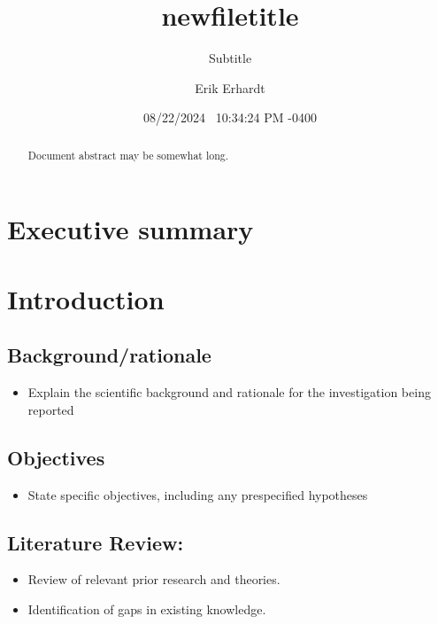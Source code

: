\documentclass[
  letterpaper,
  DIV=11,
  numbers=noendperiod,
  oneside,
  11pt]{scrartcl}
\title{newfiletitle}
\subtitle{Subtitle}
\author{Erik Erhardt}
\date{08/22/2024 ~10:34:24 PM -0400}
\providecommand{\tightlist}{%
  \setlength{\itemsep}{0pt}\setlength{\parskip}{0pt}}\usepackage{longtable,booktabs,array}
\renewcommand*\contentsname{Table of contents}
\newcommand\contentsname{Table of contents}
\begin{document}
\maketitle
\begin{abstract}
Document abstract may be somewhat long.
\end{abstract}

\renewcommand*\contentsname{Contents}
{
\hypersetup{linkcolor=}
\setcounter{tocdepth}{4}
\tableofcontents
}
\listoffigures
\listoftables

\newpage{}

\section{Executive summary}\label{sec-Executive_summary}

\newpage{}

\section{Introduction}\label{sec-Introduction}

\subsection{Background/rationale}\label{backgroundrationale}

\begin{itemize}
\tightlist
\item
  Explain the scientific background and rationale for the investigation
  being reported
\end{itemize}

\subsection{Objectives}\label{objectives}

\begin{itemize}
\tightlist
\item
  State specific objectives, including any prespecified hypotheses
\end{itemize}

\subsection{Literature Review:}\label{literature-review}

\begin{itemize}
\tightlist
\item
  Review of relevant prior research and theories.
\item
  Identification of gaps in existing knowledge.
\end{itemize}
\end{document}
